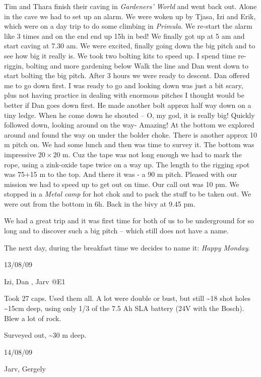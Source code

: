 Tim and Thara finish their caving in \emph{Gardeners' World} and went
back out. Alone in the cave we had to set up an alarm. We were woken up
by Tjasa, Izi and Erik, which were on a day trip to do some climbing in
\emph{Primula}. We re-start the alarm like 3 times and on the end end up
15h in bed! We finally got up at 5 am and start caving at 7.30 am. We
were excited, finally going down the big pitch and to see how big it
really is. We took two bolting kits to speed up. I spend time re-riggin,
bolting and more gardening below Walk the line and Dan went down to
start bolting the big pitch. After 3 hours we were ready to descent. Dan
offered me to go down first. I was ready to go and looking down was just
a bit scary, plus not having practice in dealing with enormous pitches I
thought would be better if Dan goes down first. He made another bolt
approx half way down on a tiny ledge. When he come down he shouted -- O,
my god, it is really big! Quickly followed down, looking around on the
way- Amazing! At the bottom we explored around and found the way on
under the bolder choke. There is another approx 10 m pitch on. We had
some lunch and then was time to survey it. The bottom was impressive
\(20\times20\) m. Cuz the tape was not long enough we had to mark the
rope, using a zink-oxide tape twice on a way up. The length to the
rigging spot was 75+15 m to the top. And there it was - a 90 m pitch.
Pleased with our mission we had to speed up to get out on time. Our call
out was 10 pm. We stopped in a \emph{Metal camp} for hot chok and to
pack the stuff to be taken out. We were out from the bottom in 6h. Back
in the bivy at 9.45 pm.

We had a great trip and it was first time for both of us to be
underground for so long and to discover such a big pitch -- which still
does not have a name.

The next day, during the breakfast time we decides to name it:
\emph{Happy Monday}.


13/08/09

Izi, Dan , Jarv @E1

Took 27 caps. Used them all. A lot were double or bust, but still
\textasciitilde 18 shot holes \textasciitilde 15cm deep, using only 1/3
of the 7.5 Ah SLA battery (24V with the Bosch). Blew a lot of rock.

Surveyed out, \textasciitilde 30 m deep.

14/08/09

Jarv, Gergely

